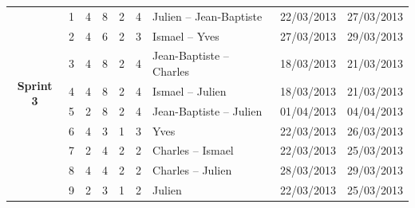 \documentclass[a4paper,11pt,french]{article}
\begin{document}
\begin{landscape}
\begin{tabularx}{20cm}{|c|r|r|r|r|r|X|c|c|}
\hline
\multirow{8}{*}{\begin{sideways}\textbf{Sprint 3}\end{sideways}}& 1& 4& 8& 2& 4& Julien -- Jean-Baptiste& 22/03/2013& 27/03/2013\\
\cline{2-9}
& 2& 4& 6& 2& 3& Ismael -- Yves& 27/03/2013& 29/03/2013\\
\cline{2-9}
& 3& 4& 8& 2& 4& Jean-Baptiste -- Charles& 18/03/2013& 21/03/2013\\
\cline{2-9}
& 4& 4& 8& 2& 4& Ismael -- Julien& 18/03/2013& 21/03/2013\\
\cline{2-9}
& 5& 2& 8& 2& 4& Jean-Baptiste -- Julien& 01/04/2013& 04/04/2013\\
\cline{2-9}
& 6& 4& 3& 1& 3& Yves& 22/03/2013& 26/03/2013\\
\cline{2-9}
& 7& 2& 4& 2& 2& Charles -- Ismael& 22/03/2013& 25/03/2013\\
\cline{2-9}
& 8& 4& 4& 2& 2& Charles -- Julien& 28/03/2013& 29/03/2013\\
\cline{2-9}
& 9& 2& 3& 1& 2& Julien & 22/03/2013& 25/03/2013\\
\hline


\end{tabularx}
\end{landscape}
\end{document}
